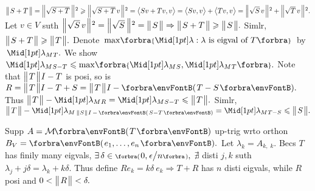 $\Dvert{S+T}=\BigDvertsq{\;\!\!\sqrt{S+T}\;\!}\geqslant\BigDvertsq{\;\!\!\sqrt{S+T}\,v}=\Ang{Sv+Tv,v}=\Ang{Sv,v}+\Ang{Tv,v}=\BigDvertsq{\;\!\!\sqrt{S}\,v}+\BigDvertsq{\;\!\!\sqrt{T}\,v}.$\parSol{}
Let $v\in V$ suth $\Big\Vert\hspace{1pt}{}\;\!\!\sqrt{S}\,v{}\hspace{1pt}\Big\Vert{\hspace{0.5pt}}{^2}=\Big\Vert\hspace{1pt}{}\;\!\!\sqrt{S}\;\!{}\hspace{1pt}\Big\Vert{\hspace{0.5pt}}{^2}=\big\Vert\hspace{1pt}{}S{}\hspace{1pt}\big\Vert\Rightarrow\big\Vert\hspace{1pt}{}S+T{}\hspace{1pt}\big\Vert\geqslant\big\Vert\hspace{1pt}{}S{}\hspace{1pt}\big\Vert.$ \;Simlr, $\big\Vert\hspace{1pt}{}S+T{}\hspace{1pt}\big\Vert\geqslant\big\Vert\hspace{1pt}{}T{}\hspace{1pt}\big\Vert.$\vspace{2.5pt}\parSol{}
Denote $\,\max\!\Bra{\aMid{\lambda}:\lambda\text{ is eigval of }T}\,$ by $\,\aMid{\lambda_M}{_T}.$ We show $\aMid{\lambda_M}{_{S-T}}\leqslant\max\!\Bra{\aMid{\lambda_M}{_S},\aMid{\lambda_M}{_T}}.$\parSol{}
Note that $\big\Vert\hspace{1pt}{}T{}\hspace{1pt}\big\Vert\:\!I-T$ is posi, so is $R=\Dvert{T}I-T+S=\Dvert{T}\:\!I-\Par{T-S}.$\parSol{}
Thus $\Dvert{T}-\aMid{\lambda_M}{_R}=\aMid{\lambda_M}{_{S-T}}\leqslant\Dvert{T}.$ \;Simlr, $\Dvert{T}-\aMid{\lambda_M}{_{\,\SmallDvert{S}\:\!I\,-\,\SmallPar{S-T}}}=\aMid{\lambda_M}{_{T-S}}\leqslant\Dvert{S}.$\PfEnd
\SepLine



Supp $A=\Mt{T}$ up-trig wrto orthon $B_V=\Par{e_1,\dots,e_n}.$ Let $\lambda_k=A_{k,\;\!k}.$\parSol{}
Becs $T$ has finily many eigvals, $\exists\,\delta\in\Interval{(}{)}{0,\:\!\epsilon\big/n},$ $\nexists$ disti $j,k$ suth $\lambda_j+j\delta=\lambda_k+k\delta.$\parSol{}
Thus define $Re_k=k\delta\:\!e_k\Rightarrow T+R$ has $n$ disti eigvals, while $R$ posi and $0<\big\Vert\hspace{1pt}{}R{}\hspace{1pt}\big\Vert<\delta.$\PfEnd
\SepLine

